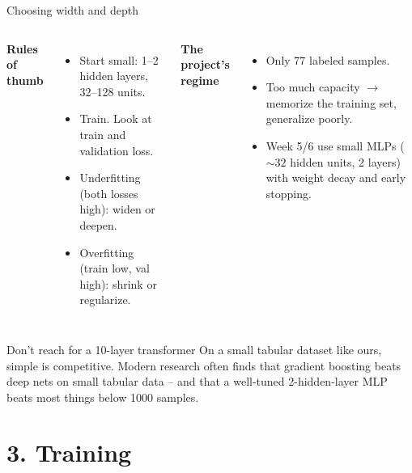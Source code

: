 \documentclass[aspectratio=169,10pt]{beamer}
\begin{document}
\begin{frame}{Choosing width and depth}
\begin{columns}[T]
\textbf{Rules of thumb}
\begin{itemize}
  \item Start small: 1--2 hidden layers, 32--128 units.
  \item Train. Look at train and validation loss.
  \item Underfitting (both losses high): widen or deepen.
  \item Overfitting (train low, val high): shrink or regularize.
\end{itemize}
\textbf{The project's regime}
\begin{itemize}
  \item Only 77 labeled samples.
  \item Too much capacity $\to$ memorize the training set, generalize poorly.
  \item Week 5/6 use small MLPs ($\sim 32$ hidden units, 2 layers) with weight decay and early stopping.
\end{itemize}
\end{columns}
\vspace{0.5em}
\begin{alertblock}{Don't reach for a 10-layer transformer}
On a small tabular dataset like ours, simple is competitive. Modern research often finds that gradient boosting beats deep nets on small tabular data -- and that a well-tuned 2-hidden-layer MLP beats most things below 1000 samples.
\end{alertblock}
\end{frame}

\section*{3. Training}
\end{document}
